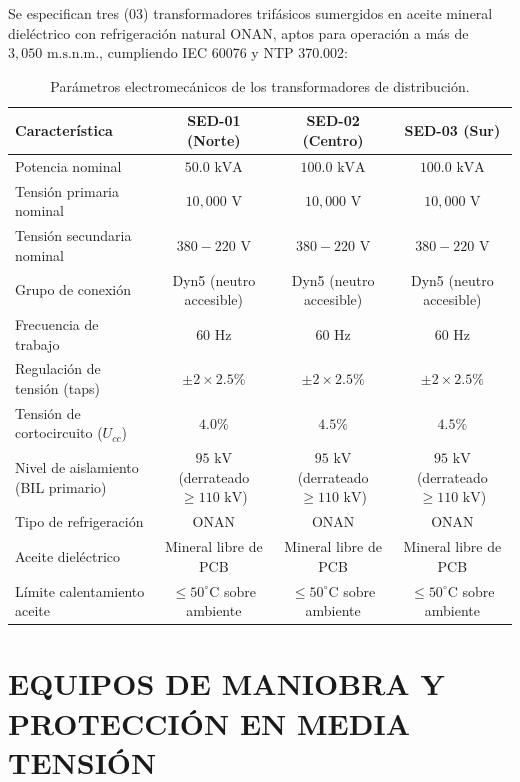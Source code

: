 Se especifican tres (03) transformadores trifásicos sumergidos en aceite mineral dieléctrico con refrigeración natural ONAN, aptos para operación a más de $3,050\text{ m.s.n.m.}$, cumpliendo IEC 60076 y NTP 370.002:
\begin{table}[H]
\centering
\small
\begin{tabular}{|l|c|c|c|}
\hline
\textbf{Característica} & \textbf{SED-01 (Norte)} & \textbf{SED-02 (Centro)} & \textbf{SED-03 (Sur)} \\
\hline
Potencia nominal & $50.0\text{ kVA}$ & $100.0\text{ kVA}$ & $100.0\text{ kVA}$ \\
Tensión primaria nominal & $10,000\text{ V}$ & $10,000\text{ V}$ & $10,000\text{ V}$ \\
Tensión secundaria nominal & $380 - 220\text{ V}$ & $380 - 220\text{ V}$ & $380 - 220\text{ V}$ \\
Grupo de conexión & Dyn5 (neutro accesible) & Dyn5 (neutro accesible) & Dyn5 (neutro accesible) \\
Frecuencia de trabajo & $60\text{ Hz}$ & $60\text{ Hz}$ & $60\text{ Hz}$ \\
Regulación de tensión (taps) & $\pm 2 \times 2.5\%$ & $\pm 2 \times 2.5\%$ & $\pm 2 \times 2.5\%$ \\
Tensión de cortocircuito ($U_{cc}$) & $4.0\%$ & $4.5\%$ & $4.5\%$ \\
Nivel de aislamiento (BIL primario) & $95\text{ kV}$ (derrateado $\ge 110\text{ kV}$) & $95\text{ kV}$ (derrateado $\ge 110\text{ kV}$) & $95\text{ kV}$ (derrateado $\ge 110\text{ kV}$) \\
Tipo de refrigeración & ONAN & ONAN & ONAN \\
Aceite dieléctrico & Mineral libre de PCB & Mineral libre de PCB & Mineral libre de PCB \\
Límite calentamiento aceite & $\le 50^\circ\text{C}$ sobre ambiente & $\le 50^\circ\text{C}$ sobre ambiente & $\le 50^\circ\text{C}$ sobre ambiente \\
\hline
\end{tabular}
\caption{Parámetros electromecánicos de los transformadores de distribución.}
\end{table}

\section{EQUIPOS DE MANIOBRA Y PROTECCIÓN EN MEDIA TENSIÓN}

